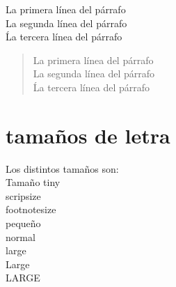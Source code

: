 \documentclass[10pt,a4paper]{article}
\begin{document}
\begin{flushright}
	La primera línea del párrafo
	\vspace{7cm} \\
	La segunda línea del párrafo
	\vspace{8cm} \\
	Ĺa tercera línea del párrafo
	\vspace{9cm} \\
\end{flushright}

\begin{quote}
	La primera línea del párrafo
	\vspace{10cm} \\
	La segunda línea del párrafo
	\vspace{11cm} \\
	Ĺa tercera línea del párrafo
	\vspace{12cm} \\
\end{quote}

\section{tamaños de letra}
Los distintos tamaños son: \\
{\tiny Tamaño tiny} \\
{\scriptsize scripsize} \\
{\footnotesize footnotesize} \\
{\small pequeño} \\
{\normalsize normal} \\
{\large large} \\
{\Large Large} \\
{\LARGE LARGE} \\ 
\end{document}
